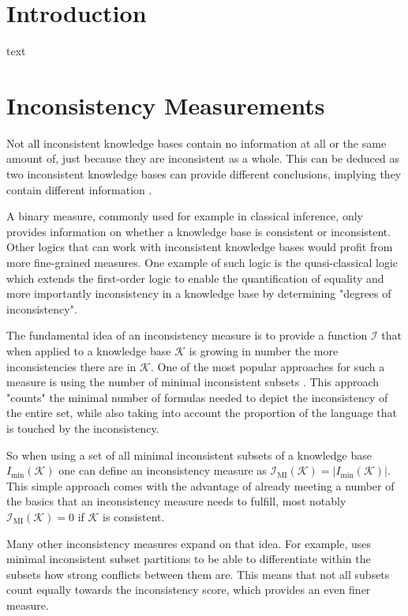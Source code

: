 \section{Introduction}
text

\section{Inconsistency Measurements}
Not all inconsistent knowledge bases contain no information at all or the same amount of, just because they are inconsistent as a whole. This can be deduced as two inconsistent knowledge bases can provide different conclusions, implying they contain different information \cite{bertossi_approaches_2005}.

A binary measure, commonly used for example in classical inference, only provides information on whether a knowledge base is consistent or inconsistent. Other logics that can work with inconsistent knowledge bases would profit from more fine-grained measures.
One example of such logic is the quasi-classical logic \cite{grant_measuring_2006} which extends the first-order logic to enable the quantification of equality and more importantly inconsistency in a knowledge base by determining "degrees of inconsistency".

The fundamental idea of an inconsistency measure is to provide a function \(\mathcal{I}\) that when applied to a knowledge base \(\mathcal{K}\) is growing in number the more inconsistencies there are in \(\mathcal{K}\). One of the most popular approaches for such a measure is using the number of minimal inconsistent subsets \cite{hunter_measuring_2008}. This approach "counts" the minimal number of formulas needed to depict the inconsistency of the entire set, while also taking into account the proportion of the language that is touched by the inconsistency.

So when using a set of all minimal inconsistent subsets of a knowledge base \(I_{\min}(\mathcal{K})\) one can define an inconsistency measure as \(\mathcal{I}_{\text{MI}}(\mathcal{K}) = \left| I_{\min}(\mathcal{K}) \right|\). This simple approach comes with the advantage of already meeting a number of the basics that an inconsistency measure needs to fulfill, most notably \(\mathcal{I}_{\text{MI}}(\mathcal{K}) = 0\) if \(\mathcal{K}\) is consistent.

Many other inconsistency measures expand on that idea. For example, \cite{jabbour_mis_2016} uses minimal inconsistent subset partitions to be able to differentiate within the subsets how strong conflicts between them are. This means that not all subsets count equally towards the inconsistency score, which provides an even finer measure.

